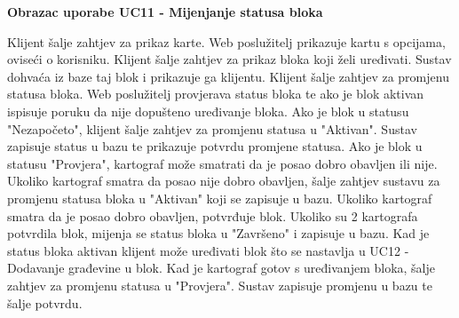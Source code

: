             	\eject

				\textbf{Obrazac uporabe UC11 - Mijenjanje statusa bloka}

                Klijent šalje zahtjev za prikaz karte. Web poslužitelj prikazuje kartu s opcijama, oviseći o korisniku. Klijent šalje zahtjev za prikaz bloka koji želi uređivati. Sustav dohvaća iz baze taj blok i prikazuje ga klijentu. Klijent šalje zahtjev za promjenu statusa bloka. Web poslužitelj provjerava status bloka te ako je blok aktivan ispisuje poruku da nije dopušteno uređivanje bloka. Ako je blok u statusu "Nezapočeto", klijent šalje zahtjev za promjenu statusa u "Aktivan". Sustav zapisuje status u bazu te prikazuje potvrdu promjene statusa. Ako je blok u statusu "Provjera", kartograf može smatrati da je posao dobro obavljen ili nije. Ukoliko kartograf smatra da posao nije dobro obavljen, šalje zahtjev sustavu za promjenu statusa bloka u "Aktivan" koji se zapisuje u bazu. Ukoliko kartograf smatra da je posao dobro obavljen, potvrđuje blok. Ukoliko su 2 kartografa potvrdila blok, mijenja se status bloka u "Završeno" i zapisuje u bazu. Kad je status bloka aktivan klijent može uređivati blok što se nastavlja u UC12 - Dodavanje građevine u blok. Kad je kartograf gotov s uređivanjem bloka, šalje zahtjev za promjenu statusa u "Provjera". Sustav zapisuje promjenu u bazu te šalje potvrdu.

